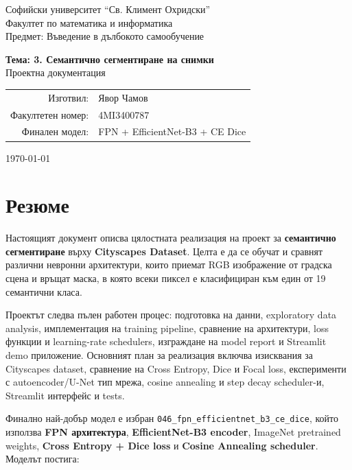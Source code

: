 \documentclass[12pt,a4paper]{article}
\newcommand{\code}[1]{\texttt{#1}}
\begin{document}
\begin{titlepage}
\centering
\vspace*{1.2cm}
{\Large Софийски университет ``Св. Климент Охридски''\\[0.3cm]}
{\Large Факултет по математика и информатика\\[0.3cm]}
{\large Предмет: Въведение в дълбокото самообучение\\[1.5cm]}

{\Huge\bfseries Тема: 3. Семантично сегментиране на снимки\\[0.8cm]}
{\Large Проектна документация\\[1.5cm]}

\begin{tabular}{rl}
Изготвил: & Явор Чамов \\
Факултетен номер: & 4MI3400787 \\
Финален модел: & FPN + EfficientNet-B3 + CE Dice \\
\end{tabular}

\vfill
{\large \today}
\end{titlepage}

\tableofcontents
\newpage

\section{Резюме}

Настоящият документ описва цялостната реализация на проект за \textbf{семантично сегментиране} върху \textbf{Cityscapes Dataset}. Целта е да се обучат и сравнят различни невронни архитектури, които приемат RGB изображение от градска сцена и връщат маска, в която всеки пиксел е класифициран към един от 19 семантични класа.

Проектът следва пълен работен процес: подготовка на данни, exploratory data analysis, имплементация на training pipeline, сравнение на архитектури, loss функции и learning-rate schedulers, изграждане на model report и Streamlit demo приложение. Основният план за реализация включва изисквания за Cityscapes dataset, сравнение на Cross Entropy, Dice и Focal loss, експерименти с autoencoder/U-Net тип мрежа, cosine annealing и step decay scheduler-и, Streamlit интерфейс и tests.

Финално най-добър модел е избран \code{046\_fpn\_efficientnet\_b3\_ce\_dice}, който използва \textbf{FPN архитектура}, \textbf{EfficientNet-B3 encoder}, ImageNet pretrained weights, \textbf{Cross Entropy + Dice loss} и \textbf{Cosine Annealing scheduler}. Моделът постига:
\end{document}
